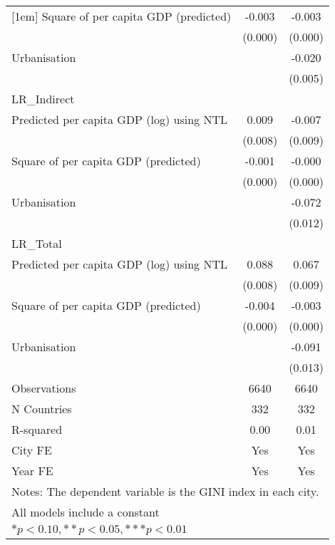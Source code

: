{\begin{tabular}{l*{2}{c}}
[1em]
Square of per capita GDP (predicted)&      -0.003\sym{***}&      -0.003\sym{***}\\
                    &     (0.000)         &     (0.000)         \\
[1em]
Urbanisation        &                     &      -0.020\sym{***}\\
                    &                     &     (0.005)         \\
\hline
LR\_Indirect         &                     &                     \\
Predicted per capita GDP (log) using NTL&       0.009         &      -0.007         \\
                    &     (0.008)         &     (0.009)         \\
[1em]
Square of per capita GDP (predicted)&      -0.001\sym{***}&      -0.000         \\
                    &     (0.000)         &     (0.000)         \\
[1em]
Urbanisation        &                     &      -0.072\sym{***}\\
                    &                     &     (0.012)         \\
\hline
LR\_Total            &                     &                     \\
Predicted per capita GDP (log) using NTL&       0.088\sym{***}&       0.067\sym{***}\\
                    &     (0.008)         &     (0.009)         \\
[1em]
Square of per capita GDP (predicted)&      -0.004\sym{***}&      -0.003\sym{***}\\
                    &     (0.000)         &     (0.000)         \\
[1em]
Urbanisation        &                     &      -0.091\sym{***}\\
                    &                     &     (0.013)         \\
\hline
Observations        &        6640         &        6640         \\
N Countries         &         332         &         332         \\
R-squared           &        0.00         &        0.01         \\
City FE             &         Yes         &         Yes         \\
Year FE             &         Yes         &         Yes         \\
\hline\hline
\multicolumn{3}{l}{\footnotesize Notes: The dependent variable is the GINI index in each city.}\\
\multicolumn{3}{l}{\footnotesize All models include a constant}\\
\multicolumn{3}{l}{\footnotesize $* p<0.10, ** p<0.05, *** p<0.01$}\\
\end{tabular}
}
